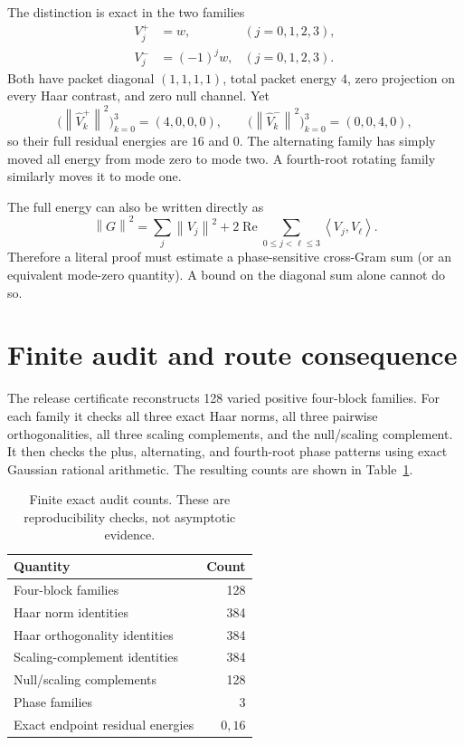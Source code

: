 \documentclass[11pt]{article}
\theoremstyle{definition}
\newcommand{\norm}[1]{\left\lVert #1\right\rVert}
\newcommand{\ip}[2]{\left\langle #1,#2\right\rangle}
\newcommand{\Vhat}{\widehat V}
\begin{document}
The distinction is exact in the two families
\begin{align*}
 V_j^+&=w, & (j=0,1,2,3),\\
 V_j^-&=(-1)^jw, & (j=0,1,2,3).
\end{align*}
Both have packet diagonal $(1,1,1,1)$, total packet energy $4$, zero projection
on every Haar contrast, and zero null channel.  Yet
\[
 \bigl(\norm{\Vhat_k^+}^2\bigr)_{k=0}^3=(4,0,0,0),
 \qquad
 \bigl(\norm{\Vhat_k^-}^2\bigr)_{k=0}^3=(0,0,4,0),
\]
so their full residual energies are $16$ and $0$.  The alternating family has
simply moved all energy from mode zero to mode two.  A fourth-root rotating family
similarly moves it to mode one.

The full energy can also be written directly as
\begin{equation}
 \norm{G}^2=\sum_j\norm{V_j}^2
  +2\operatorname{Re}\sum_{0\leq j<\ell\leq3}\ip{V_j}{V_\ell}.
 \label{eq:crossgram}
\end{equation}
Therefore a literal proof must estimate a phase-sensitive cross-Gram sum (or an
equivalent mode-zero quantity).  A bound on the diagonal sum alone cannot do so.

\section{Finite audit and route consequence}

The release certificate reconstructs 128 varied positive four-block families.
For each family it checks all three exact Haar norms, all three pairwise
orthogonalities, all three scaling complements, and the null/scaling complement.
It then checks the plus, alternating, and fourth-root phase patterns using exact
Gaussian rational arithmetic.  The resulting counts are shown in Table~\ref{tab:checks}.

\begin{table}[t]
\centering
\caption{Finite exact audit counts.  These are reproducibility checks, not
asymptotic evidence.}
\label{tab:checks}
\begin{tabular}{lr}
\toprule
Quantity & Count\\
\midrule
Four-block families & 128\\
Haar norm identities & 384\\
Haar orthogonality identities & 384\\
Scaling-complement identities & 384\\
Null/scaling complements & 128\\
Phase families & 3\\
Exact endpoint residual energies & $0,16$\\
\bottomrule
\end{tabular}
\end{table}
\end{document}
